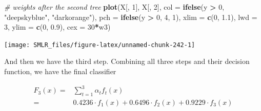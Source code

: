 \documentclass[
]{book}
\newenvironment{Shaded}{\begin{snugshade}}{\end{snugshade}}
\newcommand{\AttributeTok}[1]{\textcolor[rgb]{0.13,0.29,0.53}{#1}}
\newcommand{\CommentTok}[1]{\textcolor[rgb]{0.56,0.35,0.01}{\textit{#1}}}
\newcommand{\DecValTok}[1]{\textcolor[rgb]{0.00,0.00,0.81}{#1}}
\newcommand{\FloatTok}[1]{\textcolor[rgb]{0.00,0.00,0.81}{#1}}
\newcommand{\FunctionTok}[1]{\textcolor[rgb]{0.13,0.29,0.53}{\textbf{#1}}}
\newcommand{\NormalTok}[1]{#1}
\newcommand{\SpecialCharTok}[1]{\textcolor[rgb]{0.81,0.36,0.00}{\textbf{#1}}}
\newcommand{\StringTok}[1]{\textcolor[rgb]{0.31,0.60,0.02}{#1}}
\theoremstyle{definition}
\theoremstyle{definition}
\theoremstyle{definition}
\theoremstyle{definition}
\theoremstyle{remark}
\begin{document}
\begin{Shaded}
\begin{Highlighting}[]
  \CommentTok{\# weights after the second tree}
  \FunctionTok{plot}\NormalTok{(X[, }\DecValTok{1}\NormalTok{], X[, }\DecValTok{2}\NormalTok{], }\AttributeTok{col =} \FunctionTok{ifelse}\NormalTok{(y }\SpecialCharTok{\textgreater{}} \DecValTok{0}\NormalTok{, }\StringTok{"deepskyblue"}\NormalTok{, }\StringTok{"darkorange"}\NormalTok{),}
       \AttributeTok{pch =} \FunctionTok{ifelse}\NormalTok{(y }\SpecialCharTok{\textgreater{}} \DecValTok{0}\NormalTok{, }\DecValTok{4}\NormalTok{, }\DecValTok{1}\NormalTok{), }\AttributeTok{xlim =} \FunctionTok{c}\NormalTok{(}\DecValTok{0}\NormalTok{, }\FloatTok{1.1}\NormalTok{), }\AttributeTok{lwd =} \DecValTok{3}\NormalTok{,}
       \AttributeTok{ylim =} \FunctionTok{c}\NormalTok{(}\DecValTok{0}\NormalTok{, }\FloatTok{0.9}\NormalTok{), }\AttributeTok{cex =} \DecValTok{30}\SpecialCharTok{*}\NormalTok{w3)}
\end{Highlighting}
\end{Shaded}

\begin{center}\texttt{[image: SMLR\_files/figure-latex/unnamed-chunk-242-1]} \end{center}

And then we have the third step. Combining all three steps and their decision function, we have the final classifier

\begin{align}
F_3(x) =& \sum_{t=1}^3 \alpha_t f_t(x) \nonumber \\
=& 0.4236 \cdot f_1(x) + 0.6496 \cdot f_2(x) + 0.9229 \cdot f_3(x)
\end{align}
\end{document}
